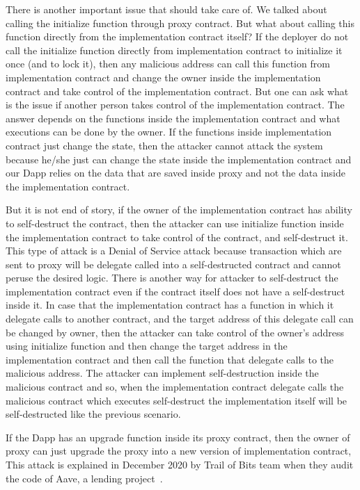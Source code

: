 There is another important issue that should take care of. We talked about calling the initialize function through proxy contract. But what about calling this function directly from the implementation contract itself? If the deployer do not call the initialize function directly from implementation contract to initialize it once (and to lock it), then any malicious address can call this function from implementation contract and change the owner inside the implementation contract and take control of the implementation contract. But one can ask what is the issue if another person takes control of the implementation contract. The answer depends on the functions inside the implementation contract and what executions can be done by the owner. If the functions inside implementation contract just change the state, then the attacker cannot attack the system because he/she just can change the state inside the implementation contract and our Dapp relies on the data that are saved inside proxy and not the data inside the implementation contract.

But it is not end of story, if the owner of the implementation contract has ability to self-destruct the contract, then the attacker can use initialize function inside the implementation contract to take control of the contract, and self-destruct it. This type of attack is a Denial of Service attack because transaction which are sent to proxy will be delegate called into a self-destructed contract and cannot peruse the desired logic. There is another way for attacker to self-destruct the implementation contract even if the contract itself does not have a self-destruct inside it. In case that the implementation contract has a function in which it delegate calls to another contract, and the target address of this delegate call can be changed by owner, then the attacker can take control of the owner's address using initialize function and then change the target address in the implementation contract and then call the function that delegate calls to the malicious address. The attacker can implement self-destruction inside the malicious contract and so, when the implementation contract delegate calls the malicious contract which executes self-destruct the implementation itself will be self-destructed like the previous scenario. 

If the Dapp has an upgrade function inside its proxy contract, then the owner of proxy can just upgrade the proxy into a new version of implementation contract, This attack is explained in December 2020 by Trail of Bits team when they audit the code of Aave, a lending project~\cite{aaveBreak}.

